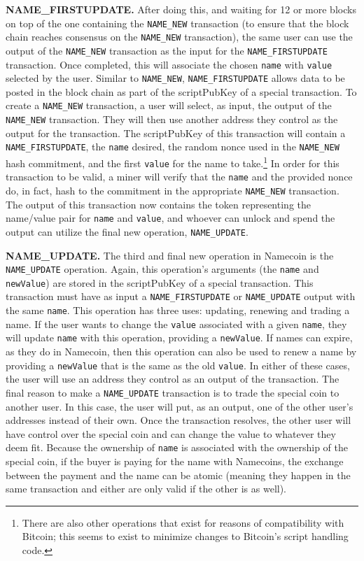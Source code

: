 {\bf NAME\_FIRSTUPDATE.}
After doing this, and waiting for 12 or more blocks on top of the one containing the {\tt NAME\_NEW} transaction (to ensure that the block chain reaches consensus on the {\tt NAME\_NEW} transaction), the same user can use the output of the {\tt NAME\_NEW} transaction as the input for the {\tt NAME\_FIRSTUPDATE} transaction. Once completed, this will associate the chosen {\tt name} with {\tt value} selected by the user. Similar to {\tt NAME\_NEW}, {\tt NAME\_FIRSTUPDATE} allows data to be posted in the block chain as part of the scriptPubKey of a special transaction. 
To create a {\tt NAME\_NEW} transaction, a user will select, as input, the output of the {\tt NAME\_NEW} transaction. They will then use another address they control as the output for the transaction. The scriptPubKey of this transaction will contain a {\tt NAME\_FIRSTUPDATE}, the {\tt name} desired, the random nonce used in the {\tt NAME\_NEW} hash commitment, and the first {\tt value} for the name to take.\footnote{There are also other operations that exist for reasons of compatibility with Bitcoin; this seems to exist to minimize changes to Bitcoin's script handling code.} 
In order for this transaction to be valid, a miner will verify that the {\tt name} and the provided nonce do, in fact, hash to the commitment in the appropriate {\tt NAME\_NEW} transaction. The output of this transaction now contains the token representing the name/value pair for {\tt name} and {\tt value}, and whoever can unlock and spend the output can utilize the final new operation, {\tt NAME\_UPDATE}.

{\bf NAME\_UPDATE.}
The third and final new operation in Namecoin is the {\tt NAME\_UPDATE} operation. Again, this operation's arguments (the {\tt name} and {\tt newValue}) are stored in the scriptPubKey of a special transaction. This transaction must have as input a {\tt NAME\_FIRSTUPDATE} or {\tt NAME\_UPDATE} output with the same {\tt name}. This operation has three uses: updating, renewing and trading a name. If the user wants to change the {\tt value} associated with a given {\tt name}, they will update {\tt name} with this operation, providing a {\tt newValue}. If names can expire, as they do in Namecoin, then this operation can also be used to renew a name by providing a {\tt newValue} that is the same as the old {\tt value}. In either of these cases, the user will use an address they control as an output of the transaction. The final reason to make a {\tt NAME\_UPDATE} transaction is to trade the special coin to another user. In this case, the user will put, as an output, one of the other user's addresses instead of their own. Once the transaction resolves, the other user will have control over the special coin and can change the value to whatever they deem fit. Because the ownership of {\tt name} is associated with the ownership of the special coin, if the buyer is paying for the name with Namecoins, the exchange between the payment and the name can be atomic (meaning they happen in the same transaction and either are only valid if the other is as well). 

